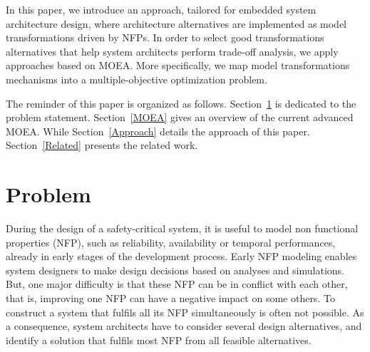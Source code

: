 \documentclass[conference]{IEEEtran}
\begin{document}
In this paper, we introduce an approach, tailored for embedded system architecture design, where architecture alternatives are implemented as model transformations driven by NFPs. In order to select good transformations alternatives that help system architects perform trade-off analysis, we apply approaches based on MOEA. More specifically, we map model transformations mechanisms into a multiple-objective optimization problem.


The reminder of this paper is organized as follows. Section~\ref{Problem} is dedicated to the problem statement. Section~\ref{MOEA} gives an overview of the current advanced MOEA. While Section~\ref{Approach} details the approach of this paper. Section~\ref{Related} presents the related work.

\section{Problem}
\label{Problem}
During the design of a safety-critical system, it is useful to model non functional properties (NFP), such as reliability, availability or temporal performances, already in early stages of the development process. Early NFP modeling enables system designers to make design decisions based on analyses and simulations. But, one major difficulty is that these NFP can be in conflict with each other, that is, improving one NFP can have a negative impact on some others. To construct a system that fulfils all its NFP simultaneously is often not possible. As a consequence, system architects have to consider several design alternatives, and identify a solution that fulfils most NFP from all feasible alternatives. 
\end{document}
